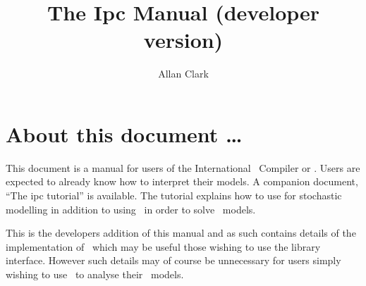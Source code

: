 \documentclass[10pt,a4paper]{article}
\title{The Ipc Manual (developer version) }
\author{
Allan Clark
}
\begin{document}
\maketitle

\section*{About this document \ldots}

This document is a manual for users of the International \pepa\ Compiler
or \ipc. Users are expected to already know how to interpret their
models. A companion document, ``The ipc tutorial'' is available.
The tutorial explains how to use \pepa\cite{pepa} for stochastic modelling
in addition to using \ipc\ in order to solve \pepa\ models.

This is the developers addition of this manual and as such contains
details of the implementation of \ipc\ which may be useful those wishing
to use the library interface. However such details may of course be
unnecessary for users simply wishing to use \ipc\ to analyse their
\pepa\ models.





\end{document}
